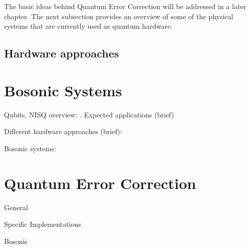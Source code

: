 The basic ideas behind Quantum Error Correction will be addressed in a later chapter. The next subsection provides an overview of some of the physical systems that are currently used as quantum hardware.

\subsection{Hardware approaches}

\section{Bosonic Systems}





\clearpage

Qubits, NISQ overview: \cite{Nielsen2010} \cite{Preskill2018} \cite{IBMintro} \cite{Kaye2007} \cite{Cleve2021}. Expected applications (brief)

Different hardware approaches (brief): \cite{Dwave} \cite{Zurich} \cite{IBMtec}

Bosonic systems: \cite{Zurich} \cite{Girvin2021}

\section{Quantum Error Correction}
General \cite{Girvin2021} \cite{Andersen2020} \cite{Gottesman2009} \cite{Roffe2019} \cite{devitt}

Specific Implementations \cite{Krinner2021} \cite{Chen2021} \cite{cleland2022}

Bosonic \cite{campagne2020} \cite{Lau2016} \cite{Chuang1997} \cite{Terhal2020} \cite{Blais2020} \cite{Hu2019} \cite{Michael2016} \cite{Grimsmo2021} \cite{Cai2021} \cite{Brady2023} \cite{lachance2023}